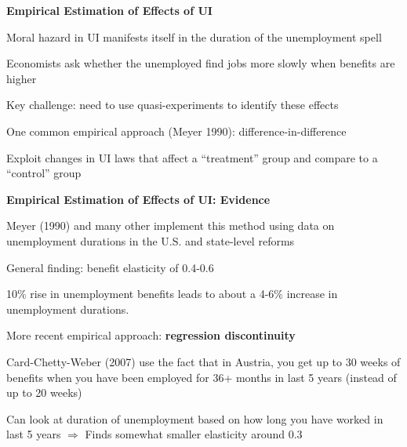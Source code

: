 \documentclass[landscape]{slides}
\begin{document}
\begin{slide}
\begin{center}
{\bf Empirical Estimation of Effects of UI}
\end{center}

Moral hazard in UI manifests itself in the duration of the unemployment spell

Economists ask whether the unemployed find jobs more slowly when benefits are higher

Key challenge: need to use quasi-experiments to identify these effects

One common empirical approach (Meyer 1990): difference-in-difference

Exploit changes in UI laws that affect a ``treatment'' group and compare to a ``control'' group

\end{slide}

\begin{slide}

\end{slide}

\begin{slide}
\begin{center}
{\bf Empirical Estimation of Effects of UI: Evidence}
\end{center}

Meyer (1990) and many other implement this method using data on unemployment durations in the U.S. and state-level reforms

General finding: benefit elasticity of 0.4-0.6

10\% rise in unemployment benefits leads to about a 4-6\% increase in unemployment durations.

More recent empirical approach:
\textbf{regression discontinuity}

Card-Chetty-Weber (2007) use the fact that in Austria, you get up to 30 weeks of benefits when you have
been employed for 36+ months in last 5 years (instead of up to 20 weeks)

Can look at duration of unemployment based on how long you have worked in last 5 years
$\Rightarrow$ Finds somewhat smaller elasticity around 0.3

\end{slide}

\begin{slide}

\end{slide}
\end{document}
